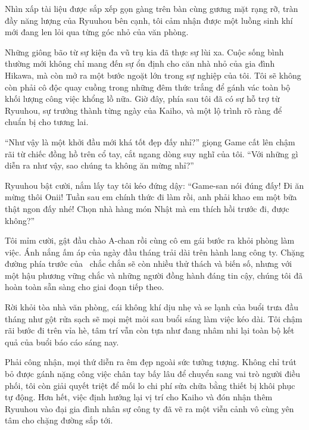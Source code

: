 \documentclass[../main.tex]{subfiles}
\begin{document}
Nhìn xấp tài liệu được sắp xếp gọn gàng trên bàn cùng gương mặt rạng rỡ, tràn đầy năng lượng của Ryuuhou bên cạnh, tôi cảm nhận được một luồng sinh khí mới đang len lỏi qua từng góc nhỏ của văn phòng.

Những giông bão từ sự kiện đa vũ trụ kia đã thực sự lùi xa. Cuộc sống bình thường mới không chỉ mang đến sự ổn định cho căn nhà nhỏ của gia đình Hikawa, mà còn mở ra một bước ngoặt lớn trong sự nghiệp của tôi. Tôi sẽ không còn phải cô độc quay cuồng trong những đêm thức trắng để gánh vác toàn bộ khối lượng công việc khổng lồ nữa. Giờ đây, phía sau tôi đã có sự hỗ trợ từ Ryuuhou, sự trưởng thành từng ngày của Kaiho, và một lộ trình rõ ràng để chuẩn bị cho tương lai.

``Như vậy là một khởi đầu mới khá tốt đẹp đấy nhỉ?'' giọng Game cất lên chậm rãi từ chiếc đồng hồ trên cổ tay, cắt ngang dòng suy nghĩ của tôi. ``Với những gì diễn ra như vậy, sao chúng ta không ăn mừng nhỉ?''

Ryuuhou bật cười, nắm lấy tay tôi kéo đứng dậy: ``Game-san nói đúng đấy! Đi ăn mừng thôi Onii! Tuần sau em chính thức đi làm rồi, anh phải khao em một bữa thật ngon đấy nhé! Chọn nhà hàng món Nhật mà em thích hồi trước đi, được không?''

Tôi mỉm cười, gật đầu chào A-chan rồi cùng cô em gái bước ra khỏi phòng làm việc. Ánh nắng ấm áp của ngày đầu tháng trải dài trên hành lang công ty. Chặng đường phía trước của \hll\ chắc chắn sẽ còn nhiều thử thách và biến số, nhưng với một hậu phương vững chắc và những người đồng hành đáng tin cậy, chúng tôi đã hoàn toàn sẵn sàng cho giai đoạn tiếp theo.

\omk


Rời khỏi tòa nhà văn phòng, cái không khí dịu nhẹ và se lạnh của buổi trưa đầu tháng như gột rửa sạch sẽ mọi mệt mỏi sau buổi sáng làm việc kéo dài. Tôi chậm rãi bước đi trên vỉa hè, tâm trí vẫn còn tựa như đang nhâm nhi lại toàn bộ kết quả của buổi báo cáo sáng nay.

Phải công nhận, mọi thứ diễn ra êm đẹp ngoài sức tưởng tượng. Không chỉ trút bỏ được gánh nặng công việc chân tay bấy lâu để chuyển sang vai trò người điều phối, tôi còn giải quyết triệt để mối lo chi phí sửa chữa bằng thiết bị khôi phục tự động. Hơn hết, việc định hướng lại vị trí cho Kaiho và đón nhận thêm Ryuuhou vào đại gia đình nhân sự công ty đã vẽ ra một viễn cảnh vô cùng yên tâm cho chặng đường sắp tới.
\end{document}
